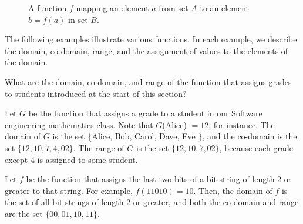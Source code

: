 \begin{figure}[htbp]
\centering
{}
\caption{A function \(f\) mapping an element \(a\) from set \(A\) to an element \(b=f(a)\) in set \(B\).}
\label{fig:function_mapping}
\end{figure}

The following examples illustrate various functions. In each example, we describe the domain, co-domain, range, and the assignment of values to the elements of the domain.

\begin{example} What are the domain, co-domain, and range of the function that assigns grades to students introduced at the start of this section?

\begin{solution}
    Let $G$ be the function that assigns a grade to a student in our Software engineering mathematics class. Note that $G$(Alice) $=12$, for instance. The domain of $G$ is the set \{Alice, Bob, Carol, Dave, Eve $\}$, and the co-domain is the set $\{12, 10, 7, 4, 02\}$. The range of $G$ is the set $\{12, 10, 7, 02\}$, because each grade except $4$ is assigned to some student.
\end{solution}
    
\end{example}

\begin{example}
    Let $f$ be the function that assigns the last two bits of a bit string of length 2 or greater to that string. For example, $f(11010)=10$. Then, the domain of $f$ is the set of all bit strings of length 2 or greater, and both the co-domain and range are the set $\{00,01,10,11\}$.
\end{example}

